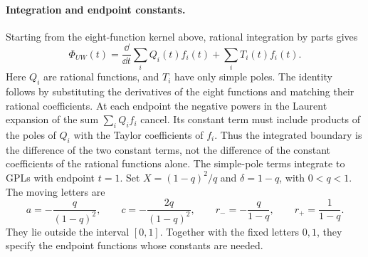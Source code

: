 \paragraph{Integration and endpoint constants.} Starting from the eight-function kernel above, rational integration by parts gives
\begin{equation} \Phi_{UW}(t)=\frac{\dd}{\dd t}\sum_i Q_i(t)f_i(t)+\sum_i T_i(t)f_i(t).\end{equation}
Here $Q_i$ are rational functions, and $T_i$ have only simple poles. The identity follows by substituting the derivatives of the eight functions and matching their rational coefficients. At each endpoint the negative powers in the Laurent expansion of the sum $\sum_iQ_if_i$ cancel. Its constant term must include products of the poles of $Q_i$ with the Taylor coefficients of $f_i$. Thus the integrated boundary is the difference of the two constant terms, not the difference of the constant coefficients of the rational functions alone.
The simple-pole terms integrate to GPLs with endpoint $t=1$.
Set $X=(1-q)^2/q$ and $\delta=1-q$, with $0<q<1$. The moving letters are
\begin{equation}
 a=-\frac{q}{(1-q)^2},\qquad c=-\frac{2q}{(1-q)^2},\qquad
 r_-=-\frac{q}{1-q},\qquad r_+=\frac1{1-q}.
\end{equation}
They lie outside the interval $[0,1]$. Together with the fixed letters
$0,1$, they specify the endpoint functions whose constants are needed.

